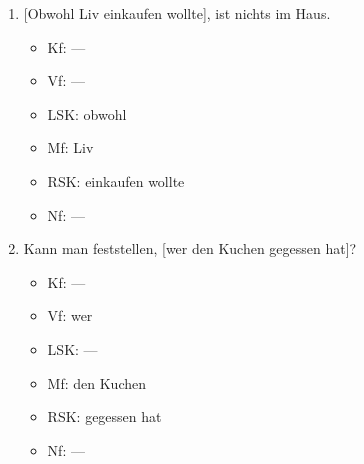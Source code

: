\begin{enumerate}
\begin{itemize}
    \end{itemize}
  \item{} [Obwohl Liv einkaufen wollte], ist nichts im Haus.
    \begin{itemize}
      \item Kf: ---
      \item Vf: ---
      \item LSK: obwohl
      \item Mf: Liv
      \item RSK: einkaufen wollte
      \item Nf: ---
    \end{itemize}
  \item Kann man feststellen, [wer den Kuchen gegessen hat]?
    \begin{itemize}
      \item Kf: ---
      \item Vf: wer
      \item LSK: ---
      \item Mf: den Kuchen
      \item RSK: gegessen hat
      \item Nf: ---
    \end{itemize}
\end{enumerate}

\label{sol:saetze02}

